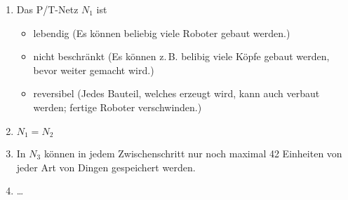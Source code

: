 \documentclass[a4paper]{scrartcl}
\begin{document}
\begin{enumerate}
    \item
        Das P/T-Netz $N_1$ ist
        \begin{itemize}
            \item lebendig (Es können beliebig viele Roboter gebaut werden.)
            \item nicht beschränkt (Es können z.\,B. belibig viele Köpfe gebaut
                werden, bevor weiter gemacht wird.)
            \item reversibel (Jedes Bauteil, welches erzeugt wird, kann auch
                verbaut werden; fertige Roboter verschwinden.)
        \end{itemize}

    \item
        $N_1 = N_2$

    \item In $N_3$ können in jedem Zwischenschritt nur noch maximal 42
        Einheiten von jeder Art von Dingen gespeichert werden.

    \item \ldots

\end{enumerate}
\end{document}

